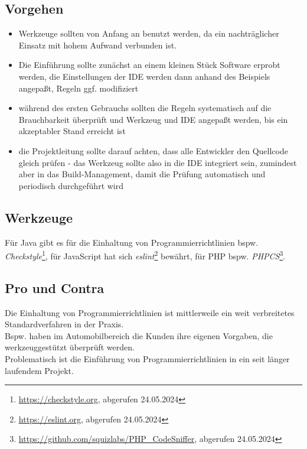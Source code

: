 \subsection*{Vorgehen}
\begin{itemize}
    \item Werkzeuge sollten von Anfang an benutzt werden, da ein nachträglicher Einsatz mit hohem Aufwand verbunden ist.
    \item Die Einführung sollte zunächst an einem kleinen Stück Software erprobt werden, die Einstellungen der IDE werden dann anhand des Beispiels angepaßt, Regeln ggf. modifiziert
    \item während des ersten Gebrauchs sollten die Regeln systematisch auf die Brauchbarkeit überprüft und Werkzeug und IDE  angepaßt werden, bis ein akzeptabler Stand erreicht ist
    \item die Projektleitung sollte darauf achten, dass alle Entwickler den Quellcode gleich prüfen - das Werkzeug sollte also in die IDE integriert sein, zumindest aber in das Build-Management, damit die Prüfung automatisch und periodisch durchgeführt wird
\end{itemize}

\subsection*{Werkzeuge}
Für Java gibt es für die Einhaltung von Programmierrichtlinien bspw. \textit{Checkstyle}\footnote{
    \url{https://checkstyle.org}, abgerufen 24.05.2024
}, für JavaScript hat sich \textit{eslint}\footnote{
    \url{https://eslint.org}, abgerufen 24.05.2024
} bewährt, für PHP bspw. \textit{PHPCS}\footnote{
\url{https://github.com/squizlabs/PHP_CodeSniffer}, abgerufen 24.05.2024
}.

\subsection*{Pro und Contra}
Die Einhaltung von Programmierrichtlinien ist mittlerweile ein weit verbreitetes Standardverfahren in der Praxis.\\
Bspw. haben im Automobilbereich die Kunden ihre eigenen Vorgaben, die werkzeuggestützt überprüft werden.\\
Problematisch ist die Einführung von Programmierrichtlinien in ein seit länger laufendem Projekt.



